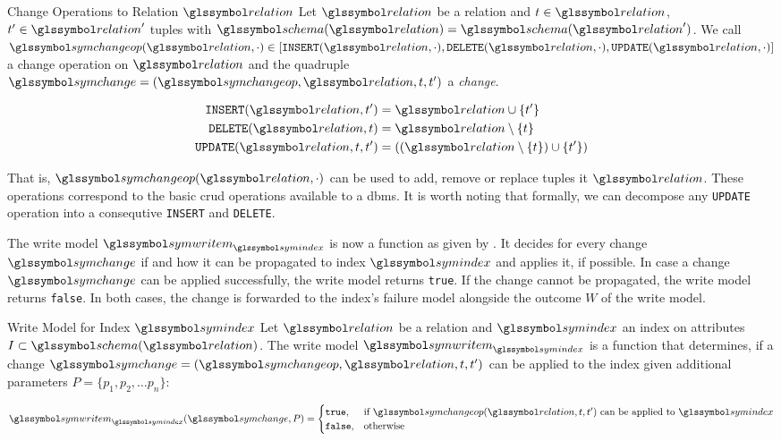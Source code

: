 \begin{definition}[label=definition:change]{Change Operations to Relation $\relation$}{}
    Let $\relation$ be a relation and $t \in \relation$, $t^{\prime} \in \relation^{\prime}$ tuples with $\schema(\relation) = \schema(\relation^{\prime})$. We call $\symchangeop(\relation,\cdot) \in [ \mathtt{INSERT}(\relation, \cdot), \mathtt{DELETE}(\relation, \cdot), \mathtt{UPDATE}(\relation, \cdot) ]$ a change operation on $\relation$ and the quadruple $\symchange = (\symchangeop, \relation, t, t^{\prime})$ a \emph{change}.

    \begin{align*}
        \mathtt{INSERT}(\relation, t^{\prime}) &= \relation \cup \lbrace t^{\prime} \rbrace \\
        \mathtt{DELETE}(\relation, t ) &= \relation \setminus \lbrace t \rbrace \\
        \mathtt{UPDATE}(\relation, t, t^{\prime}) &= ((\relation \setminus \lbrace t \rbrace) \cup \lbrace t^{\prime} \rbrace)\\
    \end{align*}

    That is, $\symchangeop(\relation,\cdot)$ can be used to add, remove or replace tuples it $\relation$. These operations correspond to the basic \acrshort{crud} operations available to a \acrshort{dbms}. It is worth noting that formally, we can decompose any \texttt{UPDATE} operation into a consequtive \texttt{INSERT} and \texttt{DELETE}.
\end{definition}

The write model $\symwritem_{\symindex}$ is now a function as given by . It decides for every change $\symchange$ if and how it can be propagated to index $\symindex$ and applies it, if possible. In case a change $\symchange$ can be applied successfully, the write model returns \texttt{true}. If the change cannot be propagated, the write model returns \texttt{false}. In both cases, the change is forwarded to the index's failure model alongside the outcome $W$ of the write model.

\begin{definition}[label=definition:write_mode]{Write Model for Index $\symindex$}{}
    Let $\relation$ be a relation and $\symindex$ an index on attributes $I \subset \schema(\relation)$. The write model $\symwritem_{\symindex}$ is a function that determines, if a change $\symchange = (\symchangeop, \relation, t, t^{\prime})$ can be applied to the index given additional parameters $P = \{p_1, p_2, \ldots p_n\}$:

    \begin{equation*}
        \symwritem_{\symindex}(\symchange,P) = 
        \begin{cases}
           \mathtt{true}, & \text{if } \symchangeop(\relation,t,t^{\prime}) \text{ can be applied to } \symindex \\
           \mathtt{false}, & \text{otherwise}
        \end{cases}
    \end{equation*}
\end{definition}

